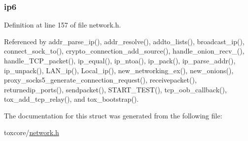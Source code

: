 \hypertarget{struct_i_p_a14c606eb5ffb078c38ad854dc4e79507}{
\subsubsection[{ip6}]{ ip6}}\label{struct_i_p_a14c606eb5ffb078c38ad854dc4e79507}


Definition at line 157 of file network.\+h.



Referenced by addr\+\_\+parse\+\_\+ip(), addr\+\_\+resolve(), addto\+\_\+lists(), broadcast\+\_\+ip(), connect\+\_\+sock\+\_\+to(), crypto\+\_\+connection\+\_\+add\+\_\+source(), handle\+\_\+onion\+\_\+recv\+\_(), handle\+\_\+\+T\+C\+P\+\_\+packet(), ip\+\_\+equal(), ip\+\_\+ntoa(), ip\+\_\+pack(), ip\+\_\+parse\+\_\+addr(), ip\+\_\+unpack(), L\+A\+N\+\_\+ip(), Local\+\_\+ip(), new\+\_\+networking\+\_\+ex(), new\+\_\+onions(), proxy\+\_\+socks5\+\_\+generate\+\_\+connection\+\_\+request(), receivepacket(), returnedip\+\_\+ports(), sendpacket(), S\+T\+A\+R\+T\+\_\+\+T\+E\+S\+T(), tcp\+\_\+oob\+\_\+callback(), tox\+\_\+add\+\_\+tcp\+\_\+relay(), and tox\+\_\+bootstrap().



The documentation for this struct was generated from the following file\+:\begin{DoxyCompactItemize}
\item 
toxcore/\hyperlink{network_8h}{network.\+h}\end{DoxyCompactItemize}
